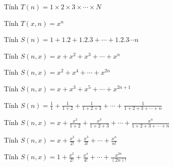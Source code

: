 \begin{problem}
   Tính $T(n) = 1 \times 2 \times 3 \times \cdots \times N$
\end{problem}


\begin{problem}
   Tính $T(x, n) = x^n$
\end{problem}


\begin{problem}
    Tính $S(n) = 1 + 1.2 + 1.2.3 + \cdots + 1.2.3 \cdots n$
\end{problem}


\begin{problem}
   Tính $S(n,x) = x + x^2 + x^3 + \cdots + x^n$
\end{problem}


\begin{problem}
  Tính $S(n,x) = x^2 + x^4 + \cdots + x^{2n}$
\end{problem}

\begin{problem}
   Tính $S(n,x) = x + x^3 + x^5 + \cdots + x^{2n + 1}$
\end{problem}

\begin{problem}
   Tính $S(n) = \frac{1}{1} + \frac{1}{1+2} + \frac{1}{1+2+3} + \cdots + \frac{1}{1+2+3+ \cdots + n}$
\end{problem}

\begin{problem}
    Tính $S(n,x) = x + \frac{x^2}{1+2} + \frac{x^3}{1+2+3} + \cdots + \frac{x^n}{1+2+3+\cdots+n}$
\end{problem}

\begin{problem}
    Tính $S(n,x) = x + \frac{x^2}{2!} + \frac{x^3}{3!} + \cdots + \frac{x^n}{n!}$
\end{problem}

\begin{problem}
    Tính $S(n,x) = 1 + \frac{x^2}{2!} + \frac{x^4}{4!} + \cdots + \frac{x^{2n}}{(2n)!}$
\end{problem}

